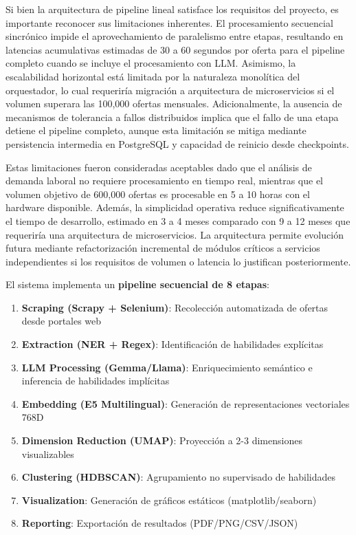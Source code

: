 Si bien la arquitectura de pipeline lineal satisface los requisitos del proyecto, es importante reconocer sus limitaciones inherentes. El procesamiento secuencial sincrónico impide el aprovechamiento de paralelismo entre etapas, resultando en latencias acumulativas estimadas de 30 a 60 segundos por oferta para el pipeline completo cuando se incluye el procesamiento con LLM. Asimismo, la escalabilidad horizontal está limitada por la naturaleza monolítica del orquestador, lo cual requeriría migración a arquitectura de microservicios si el volumen superara las 100,000 ofertas mensuales. Adicionalmente, la ausencia de mecanismos de tolerancia a fallos distribuidos implica que el fallo de una etapa detiene el pipeline completo, aunque esta limitación se mitiga mediante persistencia intermedia en PostgreSQL y capacidad de reinicio desde checkpoints.

Estas limitaciones fueron consideradas aceptables dado que el análisis de demanda laboral no requiere procesamiento en tiempo real, mientras que el volumen objetivo de 600,000 ofertas es procesable en 5 a 10 horas con el hardware disponible. Además, la simplicidad operativa reduce significativamente el tiempo de desarrollo, estimado en 3 a 4 meses comparado con 9 a 12 meses que requeriría una arquitectura de microservicios. La arquitectura permite evolución futura mediante refactorización incremental de módulos críticos a servicios independientes si los requisitos de volumen o latencia lo justifican posteriormente.

El sistema implementa un \textbf{pipeline secuencial de 8 etapas}:

\begin{enumerate}
    \item \textbf{Scraping (Scrapy + Selenium)}: Recolección automatizada de ofertas desde portales web
    \item \textbf{Extraction (NER + Regex)}: Identificación de habilidades explícitas
    \item \textbf{LLM Processing (Gemma/Llama)}: Enriquecimiento semántico e inferencia de habilidades implícitas
    \item \textbf{Embedding (E5 Multilingual)}: Generación de representaciones vectoriales 768D
    \item \textbf{Dimension Reduction (UMAP)}: Proyección a 2-3 dimensiones visualizables
    \item \textbf{Clustering (HDBSCAN)}: Agrupamiento no supervisado de habilidades
    \item \textbf{Visualization}: Generación de gráficos estáticos (matplotlib/seaborn)
    \item \textbf{Reporting}: Exportación de resultados (PDF/PNG/CSV/JSON)
\end{enumerate}

